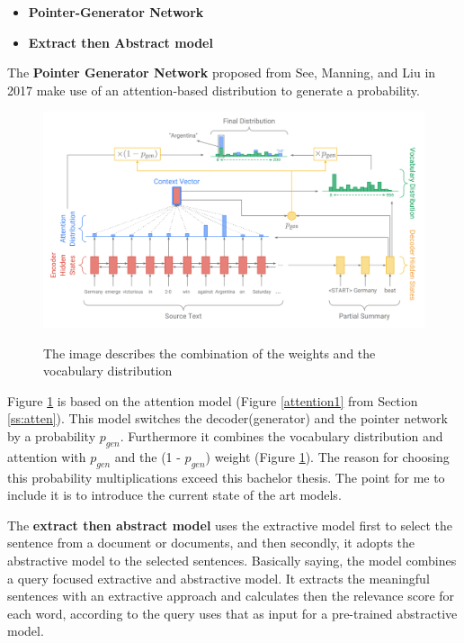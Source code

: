\begin{itemize}
	\item \textbf{Pointer-Generator Network}
	\item \textbf{Extract then Abstract model}
\end{itemize}

The \textbf{Pointer Generator Network} proposed from See, Manning, and Liu in 2017 \cite{see-etal-2017-get} make use of an attention-based distribution to generate a probability. 
\begin{figure}
	\begin{center}
		\includegraphics[width=6in]{photos/pointer}\\
		\caption{The image describes the combination of the weights and the vocabulary distribution \cite{see-etal-2017-get} }\label{pointer}
	\end{center}
\end{figure}

Figure \ref{pointer} is based on the attention model (Figure \ref{attention1} from Section \ref{ss:atten}). 
This model switches the decoder(generator) and the pointer network by a probability \(p_{gen}\).
Furthermore it combines the vocabulary distribution and attention with \(p_{gen}\) and the (1 - \(p_{gen}\)) weight (Figure \ref{pointer}). The reason for choosing this probability multiplications exceed this bachelor thesis. The point for me to include it is to introduce the current state of the art models.

The \textbf{extract then abstract model} uses the extractive model first to select the sentence from a document or documents, and then secondly, it adopts the abstractive model to the selected sentences. 
Basically saying, the model combines a query focused extractive and abstractive model. It extracts the meaningful sentences with an extractive approach and calculates then the relevance score for each word, according to the query uses that as input for a pre-trained abstractive model.

